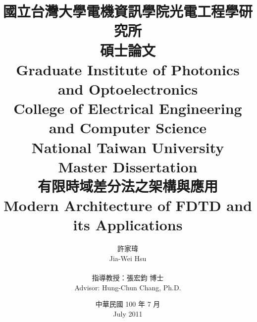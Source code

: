 \title{
  \kai 國立台灣大學電機資訊學院光電工程學研究所\\碩士論文\\
  \rm Graduate Institute of Photonics and Optoelectronics\\College of Electrical Engineering and Computer Science\\National Taiwan University\\Master Dissertation\\[1cm]
  \kai 有限時域差分法之架構與應用\\
  \rm Modern Architecture of FDTD and its Applications
}

\author{
  \kai 許家瑋\\ \rm Jia-Wei Hsu\\\\
  \kai 指導教授：張宏鈞 博士\\ \rm Advisor: Hung-Chun Chang, Ph.D.
}

\date{
  \kai 中華民國 100 年 7 月\\ 
  \rm July 2011
}

\maketitle
